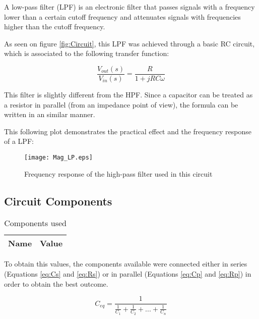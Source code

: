 A low-pass filter (LPF) is an electronic filter that passes signals with a frequency lower than a certain cutoff frequency and attenuates signals with frequencies higher than the cutoff frequency.

As seen on figure \ref{fig:Circuit}, this LPF was achieved through a basic RC circuit, which is associated to the following transfer function:

\begin{equation}
    \frac{V_{out}(s)}{V_{in}(s)} = \frac{R}{1+jRC\omega}
    \label{eq:trf_function_LPF}
\end{equation}

This filter is slightly different from the HPF. Since a capacitor can be treated as a resistor in parallel (from an impedance point of view), the formula can be written in an similar manner. 

This following plot demonstrates the practical effect and the frequency response of a LPF:

\begin{figure}[H]
    \centering
    \texttt{[image: Mag\_LP.eps]}
    \caption{Frequency response of the high-pass filter used in this circuit}
    \label{fig:freq_response_HPF}
\end{figure}

\subsection{Circuit Components}

\indent

\begin{table}[H]
  \centering
  \begin{tabular}{|l|r|}
    \hline    
    {\bf Name} & {\bf Value} \\ \hline
    
  \end{tabular}
  \caption{Components used }
  \label{tab:Components}
\end{table}

To obtain this values, the components available were connected either in series (Equations \ref{eq:Cs} and \ref{eq:Rs}) or in parallel (Equations \ref{eq:Cp} and \ref{eq:Rp}) in order to obtain the best outcome. 

\begin{equation}
    C_{eq}= \frac{1}{\frac{1}{C_1}+\frac{1}{C_2}+...+\frac{1}{C_n}}
    \label{eq:Cs}
\end{equation}

